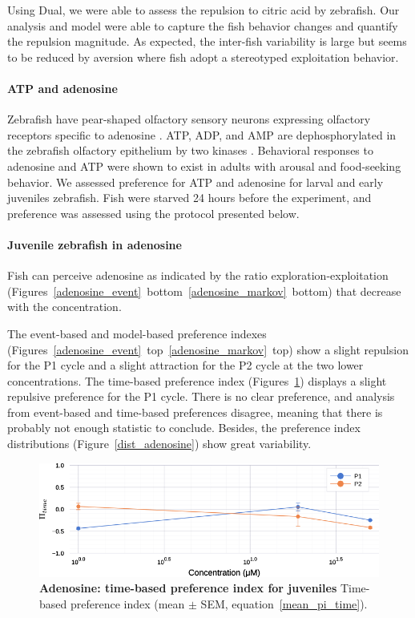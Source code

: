   Using Dual, we were able to assess the repulsion to citric acid by zebrafish. Our analysis and model were able to capture the fish behavior changes and quantify the repulsion magnitude. As expected, the inter-fish variability is large but seems to be reduced by aversion where fish adopt a stereotyped exploitation behavior.

  \paragraph{ATP and adenosine}
  Zebrafish have pear-shaped olfactory sensory neurons expressing olfactory receptors specific to adenosine \cite{wakisaka2017adenosine}. ATP, ADP, and AMP are dephosphorylated in the zebrafish olfactory epithelium by two kinases \cite{wakisaka2017adenosine}. Behavioral responses to adenosine and ATP were shown to exist in adults with arousal and food-seeking behavior. We assessed preference for ATP and adenosine for larval and early juveniles zebrafish. Fish were starved 24 hours before the experiment, and preference was assessed using the protocol presented below.

  \paragraph{Juvenile zebrafish in adenosine} Fish can perceive adenosine as indicated by the ratio exploration-exploitation (Figures~\ref{adenosine_event}~bottom~\ref{adenosine_markov}~bottom) that decrease with the concentration.

  The event-based and model-based preference indexes (Figures~\ref{adenosine_event}~top~\ref{adenosine_markov}~top) show a slight repulsion for the P1 cycle and a slight attraction for the P2 cycle at the two lower concentrations.  The time-based preference index (Figures~\ref{adenosine}) displays a slight repulsive preference for the P1 cycle. There is no clear preference, and analysis from event-based and time-based preferences disagree, meaning that there is probably not enough statistic to conclude. Besides, the preference index distributions (Figure~\ref{dist_adenosine}) show great variability.

    \begin{figure}[h!]
      \centering
      \includegraphics[width=1\textwidth]{part_2/assets/adenosine.png}
      \caption{\textbf{Adenosine: time-based preference index for juveniles} Time-based preference index (mean $\pm$ SEM, equation~\ref{mean_pi_time}).}
      \label{adenosine}
    \end{figure}

